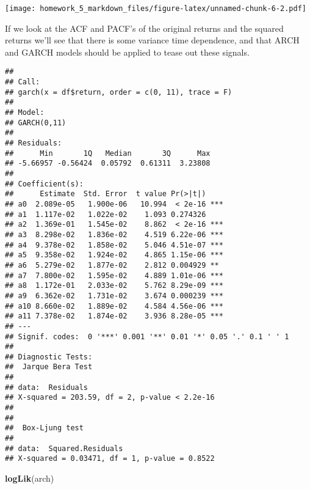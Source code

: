 \documentclass[]{article}
\newenvironment{Shaded}{\begin{snugshade}}{\end{snugshade}}
\newcommand{\KeywordTok}[1]{\textcolor[rgb]{0.13,0.29,0.53}{\textbf{#1}}}
\newcommand{\DataTypeTok}[1]{\textcolor[rgb]{0.13,0.29,0.53}{#1}}
\newcommand{\DecValTok}[1]{\textcolor[rgb]{0.00,0.00,0.81}{#1}}
\newcommand{\StringTok}[1]{\textcolor[rgb]{0.31,0.60,0.02}{#1}}
\newcommand{\CommentTok}[1]{\textcolor[rgb]{0.56,0.35,0.01}{\textit{#1}}}
\newcommand{\OperatorTok}[1]{\textcolor[rgb]{0.81,0.36,0.00}{\textbf{#1}}}
\newcommand{\NormalTok}[1]{#1}
\begin{document}
\texttt{[image: homework\_5\_markdown\_files/figure-latex/unnamed-chunk-6-2.pdf]}

If we look at the ACF and PACF's of the original returns and the squared
returns we'll see that there is some variance time dependence, and that
ARCH and GARCH models should be applied to tease out these signals.

\begin{Shaded}
\end{Shaded}

\begin{verbatim}
## 
## Call:
## garch(x = df$return, order = c(0, 11), trace = F)
## 
## Model:
## GARCH(0,11)
## 
## Residuals:
##      Min       1Q   Median       3Q      Max 
## -5.66957 -0.56424  0.05792  0.61311  3.23808 
## 
## Coefficient(s):
##      Estimate  Std. Error  t value Pr(>|t|)    
## a0  2.089e-05   1.900e-06   10.994  < 2e-16 ***
## a1  1.117e-02   1.022e-02    1.093 0.274326    
## a2  1.369e-01   1.545e-02    8.862  < 2e-16 ***
## a3  8.298e-02   1.836e-02    4.519 6.22e-06 ***
## a4  9.378e-02   1.858e-02    5.046 4.51e-07 ***
## a5  9.358e-02   1.924e-02    4.865 1.15e-06 ***
## a6  5.279e-02   1.877e-02    2.812 0.004929 ** 
## a7  7.800e-02   1.595e-02    4.889 1.01e-06 ***
## a8  1.172e-01   2.033e-02    5.762 8.29e-09 ***
## a9  6.362e-02   1.731e-02    3.674 0.000239 ***
## a10 8.660e-02   1.889e-02    4.584 4.56e-06 ***
## a11 7.378e-02   1.874e-02    3.936 8.28e-05 ***
## ---
## Signif. codes:  0 '***' 0.001 '**' 0.01 '*' 0.05 '.' 0.1 ' ' 1
## 
## Diagnostic Tests:
##  Jarque Bera Test
## 
## data:  Residuals
## X-squared = 203.59, df = 2, p-value < 2.2e-16
## 
## 
##  Box-Ljung test
## 
## data:  Squared.Residuals
## X-squared = 0.03471, df = 1, p-value = 0.8522
\end{verbatim}

\begin{Shaded}
\begin{Highlighting}[]
\KeywordTok{logLik}\NormalTok{(arch)}
\end{Highlighting}
\end{Shaded}
\end{document}
